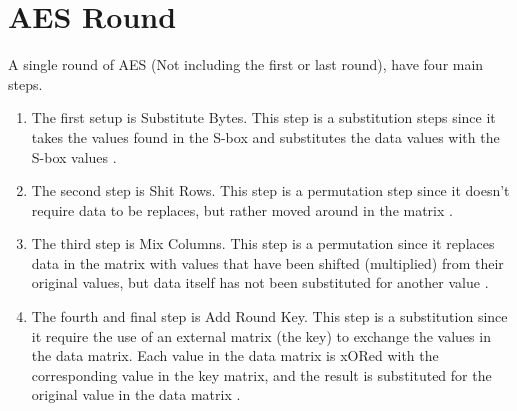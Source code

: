 \documentclass[14pt]{extarticle}
\begin{document}
\section{AES Round \cite{bblearn}}
A single round of AES (Not including the first or last round), have four main steps.\\
\begin{enumerate}
\item The first setup is Substitute Bytes. This step is a substitution steps since it takes the values found in the S-box and substitutes the data values with the S-box values \cite[p.~645]{stallings}.\\
\item The second step is Shit Rows. This step is a permutation step since it doesn't require data to be replaces, but rather moved around in the matrix \cite[p.~645]{stallings}.\\
\item The third step is Mix Columns. This step is a permutation since it replaces data in the matrix with values that have been shifted (multiplied) from their original values, but data itself has not been substituted for another value \cite[p.~646]{stallings}.\\
\item The fourth and final step is Add Round Key. This step is a substitution since it require the use of an external matrix (the key) to exchange the values in the data matrix. Each value in the data matrix is xORed with the corresponding value in the key matrix, and the result is substituted for the original value in the data matrix \cite[p.~646]{stallings}. \\
\end{enumerate}
\end{document}
